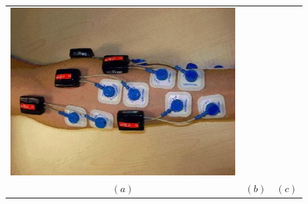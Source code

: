 \documentclass{article}
\begin{document}
\begin{figure}[!ht]
\begin{tabular}{ccc}
    \includegraphics[height=0.16\textheight]{El_Arrangement.eps} \\
    $(a)$ & $(b)$ & $(c)$ \\
  \end{tabular}
\end{figure}
\end{document}
